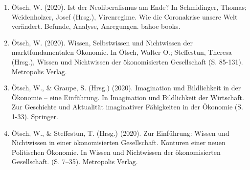 \begin{enumerate}
	 \item Ötsch, W. (2020). Ist der Neoliberalismus am Ende? In Schmidinger, Thomas; Weidenholzer, Josef (Hrsg.), Virenregime. Wie die Coronakrise unsere Welt verändert. Befunde, Analyse, Anregungen. bahoe books.
	 \item Ötsch, W. (2020). Wissen, Selbstwissen und Nichtwissen der marktfundamentalen Ökonomie. In Ötsch, Walter O.; Steffestun, Theresa (Hrsg.), Wissen und Nichtwissen der ökonomisierten Gesellschaft (S. 85-131). Metropolis Verlag.
	 \item Ötsch, W., \& Graupe, S. (Hrsg.) (2020). Imagination und Bildlichkeit in der Ökonomie – eine Einführung. In Imagination und Bildlichkeit der Wirtschaft. Zur Geschichte und Aktualität imaginativer Fähigkeiten in der Ökonomie (S. 1-33). Springer.
	 \item Ötsch, W., \& Steffestun, T. (Hrsg.) (2020). Zur Einführung: Wissen und Nichtwissen in einer ökonomisierten Gesellschaft. Konturen einer neuen Politischen Ökonomie. In Wissen und Nichtwissen der ökonomisierten Gesellschaft. (S. 7–35). Metropolis Verlag.
\end{enumerate}
